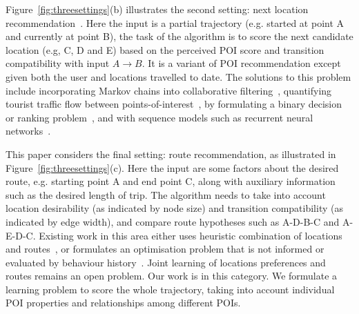 Figure~\ref{fig:threesettings}(b) illustrates the second setting: next location recommendation~\cite{ijcai13,aaai16,baraglia2013learnext,zhang2015location}. Here the input is a partial trajectory (e.g. started at point A and currently at point B), the task of the algorithm is to score the next candidate location (e.g, C, D and E) based on the perceived POI score and transition compatibility with input $A\rightarrow B$.
It is a variant of POI recommendation except given both the user and locations travelled to date. The solutions to this problem include incorporating Markov chains into collaborative filtering~\cite{fpmc10,ijcai13,zhang2015location},
quantifying tourist traffic flow between points-of-interest~\cite{zheng2012patterns},
by formulating a binary decision or ranking problem~\cite{baraglia2013learnext}, and with sequence models such as recurrent neural networks~\cite{aaai16}.



This paper considers the final setting: route recommendation, as illustrated in Figure~\ref{fig:threesettings}(c). Here the input are some factors about the desired route, e.g. starting point A and end point C, along with auxiliary information such as the desired length of trip. The algorithm needs to take into account location desirability (as indicated by node size) and transition compatibility (as indicated by edge width), and compare route hypotheses such as A-D-B-C and A-E-D-C. Existing work in this area either uses heuristic combination of locations and routes~\cite{lu2010photo2trip,ijcai15,lu2012personalized}, or formulates an optimisation problem that is not informed or evaluated by behaviour history~\cite{gioniswsdm14,chen2015tripplanner}. Joint learning of locations preferences and routes remains an open problem.
Our work is in this category. We formulate a learning problem to score the whole trajectory, taking into account individual POI properties and relationships among different POIs.



